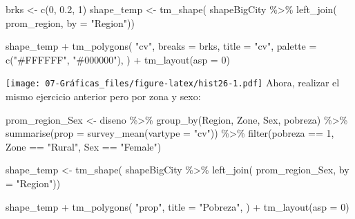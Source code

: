 \documentclass[
  12pt,
]{book}
\newenvironment{Shaded}{\begin{snugshade}}{\end{snugshade}}
\newcommand{\AttributeTok}[1]{\textcolor[rgb]{0.77,0.63,0.00}{#1}}
\newcommand{\DecValTok}[1]{\textcolor[rgb]{0.00,0.00,0.81}{#1}}
\newcommand{\FloatTok}[1]{\textcolor[rgb]{0.00,0.00,0.81}{#1}}
\newcommand{\FunctionTok}[1]{\textcolor[rgb]{0.00,0.00,0.00}{#1}}
\newcommand{\NormalTok}[1]{#1}
\newcommand{\OtherTok}[1]{\textcolor[rgb]{0.56,0.35,0.01}{#1}}
\newcommand{\SpecialCharTok}[1]{\textcolor[rgb]{0.00,0.00,0.00}{#1}}
\newcommand{\StringTok}[1]{\textcolor[rgb]{0.31,0.60,0.02}{#1}}
\begin{document}
\begin{Shaded}
\begin{Highlighting}[]
\NormalTok{brks }\OtherTok{\textless{}{-}} \FunctionTok{c}\NormalTok{(}\DecValTok{0}\NormalTok{, }\FloatTok{0.2}\NormalTok{, }\DecValTok{1}\NormalTok{)}
\NormalTok{shape\_temp }\OtherTok{\textless{}{-}} \FunctionTok{tm\_shape}\NormalTok{(}
\NormalTok{  shapeBigCity }\SpecialCharTok{\%\textgreater{}\%}
    \FunctionTok{left\_join}\NormalTok{(}
\NormalTok{      prom\_region,}
      \AttributeTok{by =} \StringTok{"Region"}\NormalTok{))}

\NormalTok{shape\_temp }\SpecialCharTok{+} \FunctionTok{tm\_polygons}\NormalTok{(}
  \StringTok{"cv"}\NormalTok{,}
  \AttributeTok{breaks =}\NormalTok{ brks,}
  \AttributeTok{title =} \StringTok{"cv"}\NormalTok{,}
  \AttributeTok{palette =} \FunctionTok{c}\NormalTok{(}\StringTok{"\#FFFFFF"}\NormalTok{, }\StringTok{"\#000000"}\NormalTok{),}
\NormalTok{) }\SpecialCharTok{+} \FunctionTok{tm\_layout}\NormalTok{(}\AttributeTok{asp =} \DecValTok{0}\NormalTok{)}
\end{Highlighting}
\end{Shaded}

\texttt{[image: 07-Gráficas\_files/figure-latex/hist26-1.pdf]}
Ahora, realizar el mismo ejercicio anterior pero por zona y sexo:

\begin{Shaded}
\begin{Highlighting}[]
\NormalTok{prom\_region\_Sex }\OtherTok{\textless{}{-}}\NormalTok{ diseno }\SpecialCharTok{\%\textgreater{}\%}
  \FunctionTok{group\_by}\NormalTok{(Region, Zone, Sex, pobreza) }\SpecialCharTok{\%\textgreater{}\%}
  \FunctionTok{summarise}\NormalTok{(}\AttributeTok{prop =} \FunctionTok{survey\_mean}\NormalTok{(}\AttributeTok{vartype =} \StringTok{"cv"}\NormalTok{)) }\SpecialCharTok{\%\textgreater{}\%}
  \FunctionTok{filter}\NormalTok{(pobreza }\SpecialCharTok{==} \DecValTok{1}\NormalTok{, Zone }\SpecialCharTok{==} \StringTok{"Rural"}\NormalTok{, Sex }\SpecialCharTok{==} \StringTok{"Female"}\NormalTok{)}

\NormalTok{shape\_temp }\OtherTok{\textless{}{-}} \FunctionTok{tm\_shape}\NormalTok{(}
\NormalTok{  shapeBigCity }\SpecialCharTok{\%\textgreater{}\%}
    \FunctionTok{left\_join}\NormalTok{(}
\NormalTok{      prom\_region\_Sex,}
      \AttributeTok{by =} \StringTok{"Region"}\NormalTok{))}

\NormalTok{shape\_temp }\SpecialCharTok{+} \FunctionTok{tm\_polygons}\NormalTok{(}
  \StringTok{"prop"}\NormalTok{,}
  \AttributeTok{title =} \StringTok{"Pobreza"}\NormalTok{,}
\NormalTok{) }\SpecialCharTok{+} \FunctionTok{tm\_layout}\NormalTok{(}\AttributeTok{asp =} \DecValTok{0}\NormalTok{)}
\end{Highlighting}
\end{Shaded}
\end{document}
